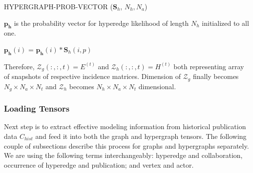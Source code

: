 \documentclass{sig-alternate}
\begin{document}
\begin{algorithm} %
\caption{HYPERGRAPH-PROB-VECTOR ($\mathbf{S}_h$, $N_h, N_a$) } %
\label{alg2} %
\begin{algorithmic}[1] %

\STATE $\mathbf{p_h}$ is the probability vector for hyperedge likelihood of length $N_h$ initialized to all one.

\STATE $\mathbf{p_h}(i)$ = $\mathbf{p_h}(i) \ast \mathbf{S}_h (i,p)$ 
\ENDFOR 
\ENDFOR 


\end{algorithmic}
\end{algorithm}

Therefore, $\mathscr{Z}_{g}(:,:,t)=E^{(t)}$ and $\mathscr{Z}_{h}(:,:,t)=H^{(t)}$ both representing array of snapshots of respective incidence matrices. Dimension of $\mathscr{Z}_{g}$ finally becomes \(N_{g}\times N_{a}\times N_{t}\) and $\mathscr{Z}_{h}$ becomes \(N_{h}\times N_{a}\times N_{t}\) dimensional.

\subsubsection{Loading Tensors}

Next step is to extract effective modeling information from historical publication data $C_{hist}$ and feed it into both the graph and hypergraph tensors. The following couple of subsections describe this process for graphs and hypergraphs separately. We are using the following terms interchangeably: hyperedge and collaboration, occurrence of hyperedge and publication; and vertex and actor.
\end{document}
